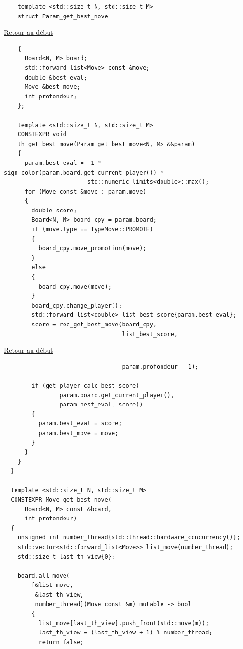 {\begin{frame}[fragile]
\begin{verbatim}
    template <std::size_t N, std::size_t M>
    struct Param_get_best_move
\end{verbatim}
\end{frame}

\begin{frame}[fragile]
\hyperlink{conclusion}{Retour au début}\newline
\begin{verbatim}
    {
      Board<N, M> board;
      std::forward_list<Move> const &move;
      double &best_eval;
      Move &best_move;
      int profondeur;
    };

    template <std::size_t N, std::size_t M>
    CONSTEXPR void
    th_get_best_move(Param_get_best_move<N, M> &&param)
    {
      param.best_eval = -1 * sign_color(param.board.get_current_player()) *
                        std::numeric_limits<double>::max();
      for (Move const &move : param.move)
      {
        double score;
        Board<N, M> board_cpy = param.board;
        if (move.type == TypeMove::PROMOTE)
        {
          board_cpy.move_promotion(move);
        }
        else
        {
          board_cpy.move(move);
        }
        board_cpy.change_player();
        std::forward_list<double> list_best_score{param.best_eval};
        score = rec_get_best_move(board_cpy,
                                  list_best_score,
\end{verbatim}
\end{frame}

\begin{frame}[fragile]
\hyperlink{conclusion}{Retour au début}\newline
\begin{verbatim}
                                  param.profondeur - 1);

        if (get_player_calc_best_score(
                param.board.get_current_player(),
                param.best_eval, score))
        {
          param.best_eval = score;
          param.best_move = move;
        }
      }
    }
  }

  template <std::size_t N, std::size_t M>
  CONSTEXPR Move get_best_move(
      Board<N, M> const &board,
      int profondeur)
  {
    unsigned int number_thread{std::thread::hardware_concurrency()};
    std::vector<std::forward_list<Move>> list_move(number_thread);
    std::size_t last_th_view{0};

    board.all_move(
        [&list_move,
         &last_th_view,
         number_thread](Move const &m) mutable -> bool
        {
          list_move[last_th_view].push_front(std::move(m));
          last_th_view = (last_th_view + 1) % number_thread;
          return false;
\end{verbatim}
\end{frame}

}
